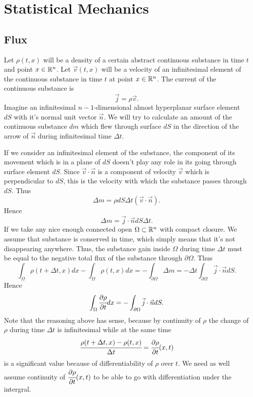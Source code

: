 \documentclass[main.tex]{subfiles}
\begin{document}
\section{Statistical Mechanics}
\subsection{Flux}
Let $\rho(t,x)$ will be a density of a certain abstract continuous substance in time $t$ and point $x\in\mathbb{R}^n$. Let $\vec{v}(t,x)$ will be a velocity of an infinitesimal element of the continuous substance in time $t$ at point $x\in\mathbb{R}^n$.
The current of the continuous substance is
\begin{equation}
\vec{j} = \rho \vec{v}.
\end{equation}
Imagine an infinitesimal $n-1$-dimensional almost hyperplanar surface element $dS$ with it's normal unit vector $\vec{n}$. We will try to calculate an amount of the continuous substance $dm$ which flew through surface $dS$ in the direction of the arrow of $\vec{n}$ during infinitesimal time $\Delta t$.
 
If we consider an infinitesimal element of the substance, the component of its movement which is in a plane of $dS$ doesn't play any role in its going through surface element $dS$. Since $\vec{v}\cdot \vec{n}$ is a component of velocity $\vec{v}$ which is perpendicular to $dS$, this is the velocity with which the substance passes through $dS$. Thus
\begin{equation}
\Delta m = \rho dS\Delta t(\vec{v}\cdot\vec{n}).
\end{equation}
Hence 
\begin{equation}
\Delta m = \vec{j}\cdot\vec{n} dS\Delta t.
\end{equation}
If we take any nice enough connected open $\Omega\subset \mathbb{R}^n$ with compact closure.
We assume that substance is conserved in time, which simply means that it's not disappearing anywhere. Thus, the substance gain inside $\Omega$ during time $\Delta t$ must be equal to the negative total flux of the substance through $\partial \Omega$. Thus
\begin{equation}
\int_\Omega \rho(t + \Delta t, x)dx - \int_\Omega \rho(t, x)dx = 
-\int_{\partial \Omega} \Delta m = -\Delta t \int_{\partial \Omega} \vec{j}\cdot\vec{n} dS.
\end{equation}
Hence
\begin{equation}
\int_\Omega \cfrac{\partial \rho}{\partial t} dx = -\int_{\partial \Omega} \vec{j}\cdot\vec{n} dS.
\end{equation}
Note that the reasoning above has sense, because by continuity of $\rho$ the change of $\rho$ during time $\Delta t$ is infinitesimal while at the same time $$\cfrac{\rho(t + \Delta t, x) - \rho(t, x)}{\Delta t} = \cfrac{\partial \rho}{\partial t}(x,t)$$ is a significant value because of differentiability of $\rho$ over $t$. We need as well assume continuity of $\cfrac{\partial \rho}{\partial t}(x,t)$ to be able to go with differentiation under the intergral.
\end{document}
